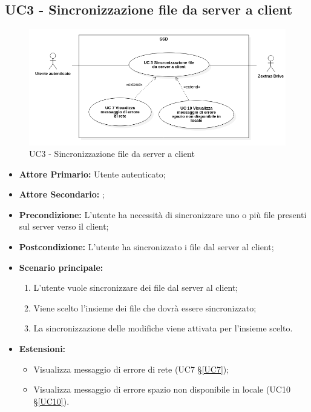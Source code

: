 \subsection{UC3 - Sincronizzazione file da server a client}
\label{UC3}
\begin{figure}[H]
    \centering
    \includegraphics[scale = 0.5]{components/img/UC3.png}
    \caption{UC3 - Sincronizzazione file da server a client}
\end{figure}
\begin{itemize}
\item \textbf{Attore Primario:} Utente autenticato;
\item \textbf{Attore Secondario:} ;
\item \textbf{Precondizione:} L'utente ha necessità di sincronizzare uno o più file presenti sul server verso il client;
\item \textbf{Postcondizione:} L'utente ha sincronizzato i file dal server al client;
\item \textbf{Scenario principale:}
    \begin{enumerate}
    \item L'utente vuole sincronizzare dei file dal server al client;
    \item Viene scelto l'insieme dei file che dovrà essere sincronizzato;
    \item La sincronizzazione delle modifiche viene attivata per l'insieme scelto.
    \end{enumerate}
\item \textbf{Estensioni:}
    \begin{itemize}
    \item Visualizza messaggio di errore di rete (UC7 \S{}\ref{UC7});
    \item Visualizza messaggio di errore spazio non disponibile in locale (UC10 \S{}\ref{UC10}).
\end{itemize}
\end{itemize}
